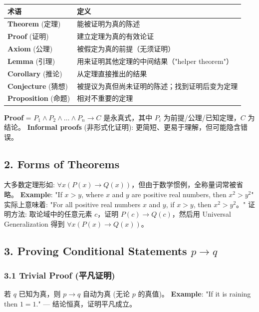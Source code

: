 \documentclass[10pt,a4paper,openany]{ctexbook}
\theoremstyle{definition}
\theoremstyle{remark}
\begin{document}
\begin{center}
\begin{tabular}{ll}
\hline
术语 & 定义 \\ \hline
\textbf{Theorem} (定理) & 能被证明为真的陈述 \\
\textbf{Proof} (证明) & 建立定理为真的有效论证 \\
\textbf{Axiom} (公理) & 被假定为真的前提（无须证明） \\
\textbf{Lemma} (引理) & 用来证明其他定理的中间结果（"helper theorem"） \\
\textbf{Corollary} (推论) & 从定理直接推出的结果 \\
\textbf{Conjecture} (猜想) & 被提议为真但尚未证明的陈述；找到证明后变为定理 \\
\textbf{Proposition} (命题) & 相对不重要的定理 \\
\hline
\end{tabular}

\end{center}

\textbf{Proof} = $P_1 \land P_2 \land \dots \land P_n \to C$ 是永真式，其中 $P_i$ 为前提/公理/已知定理，$C$ 为结论。
\textbf{Informal proofs} (非形式化证明): 更简短、更易于理解，但可能隐含错误。
\vspace{-2pt}

\subsection{2. Forms of Theorems}

大多数定理形如: $\forall x (P(x) \to Q(x))$，但由于数学惯例，全称量词常被省略。
\textbf{Example}: "If $x > y$, where $x$ and $y$ are positive real numbers, then $x^2 > y^2$"
实际上意味着: "For all positive real numbers $x$ and $y$, if $x > y$, then $x^2 > y^2$。"
证明方法: 取论域中的任意元素 $c$，证明 $P(c) \to Q(c)$，然后用 Universal Generalization 得到 $\forall x (P(x) \to Q(x))$。
\vspace{-2pt}

\subsection{3. Proving Conditional Statements $p \to q$}

\subsubsection{3.1 Trivial Proof (平凡证明)}

若 $q$ 已知为真，则 $p \to q$ 自动为真 (无论 $p$ 的真值)。
\textbf{Example}: "If it is raining then $1 = 1$." — 结论恒真，证明平凡成立。
\vspace{-2pt}
\end{document}
